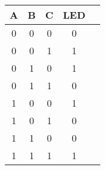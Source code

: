 \begin{table}
\centering
\begin{tabular}{|c|c|c|c|c|}
\hline
 A  &  B  &  C  & LED \\
 \hline\hline
 0  &  0  &  0  &  0  \\
 \hline
 0  &  0  &  1  &  1  \\
 \hline
 0  &  1  &  0  &  1  \\
 \hline
 0  &  1  &  1  &  0  \\
 \hline
 1  &  0  &  0  &  1  \\
 \hline
 1  &  0  &  1  &  0  \\
 \hline
 1  &  1  &  0  &  0  \\
 \hline
 1  &  1  &  1  &  1  \\
 \hline
\end{tabular}
\par
\end{table}
